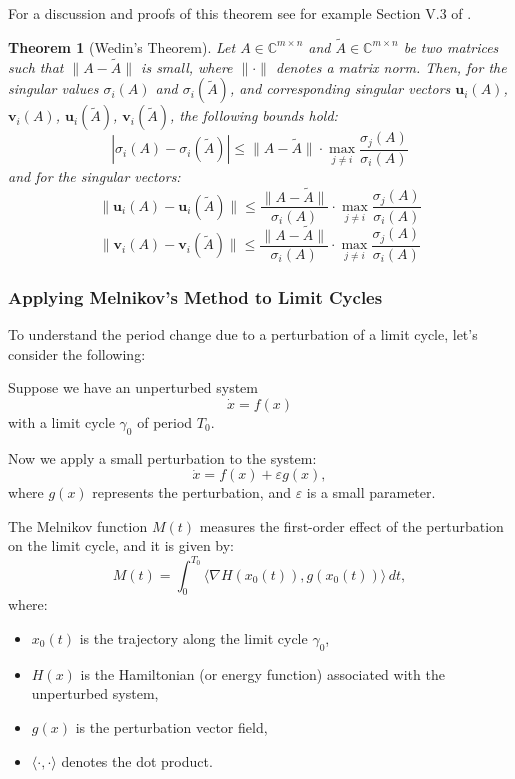 \documentclass{article}
\newtheorem{theorem}{Theorem}
\theoremstyle{definition} \newtheorem{definition}{Definition}
\theoremstyle{remark} \newtheorem{remark}{Remark}
\newcounter{ct}
\begin{document}
For a discussion and proofs of this theorem see for example Section V.3 of \citet{stewart1990matrix}.


\begin{theorem}[Wedin's Theorem]
Let \( A \in \mathbb{C}^{m \times n} \) and \( \tilde{A} \in \mathbb{C}^{m \times n} \) be two matrices such that \( \| A - \tilde{A} \| \) is small, where \( \| \cdot \| \) denotes a matrix norm. Then, for the singular values \( \sigma_i(A) \) and \( \sigma_i(\tilde{A}) \), and corresponding singular vectors \( \mathbf{u}_i(A) \), \( \mathbf{v}_i(A) \), \( \mathbf{u}_i(\tilde{A}) \), \( \mathbf{v}_i(\tilde{A}) \), the following bounds hold:
\[
\left| \sigma_i(A) - \sigma_i(\tilde{A}) \right| \leq \| A - \tilde{A} \| \cdot \max_{j \neq i} \frac{\sigma_j(A)}{\sigma_i(A)}
\]
and for the singular vectors:
\[
\| \mathbf{u}_i(A) - \mathbf{u}_i(\tilde{A}) \| \leq \frac{\| A - \tilde{A} \|}{\sigma_i(A)} \cdot \max_{j \neq i} \frac{\sigma_j(A)}{\sigma_i(A)}
\]
\[
\| \mathbf{v}_i(A) - \mathbf{v}_i(\tilde{A}) \| \leq \frac{\| A - \tilde{A} \|}{\sigma_i(A)} \cdot \max_{j \neq i} \frac{\sigma_j(A)}{\sigma_i(A)}
\]
\end{theorem}




\subsubsection{Applying Melnikov’s Method to Limit Cycles}

To understand the period change due to a perturbation of a limit cycle, let’s consider the following:

Suppose we have an unperturbed system
\[
\dot{x} = f(x)
\]
with a limit cycle \(\gamma_0\) of period \(T_0\).

Now we apply a small perturbation to the system:
\[
\dot{x} = f(x) + \varepsilon g(x),
\]
where \(g(x)\) represents the perturbation, and \(\varepsilon\) is a small parameter.

The Melnikov function \(M(t)\) measures the first-order effect of the perturbation on the limit cycle, and it is given by:
\[
M(t) = \int_0^{T_0} \langle \nabla H(x_0(t)), g(x_0(t)) \rangle \, dt,
\]
where:
\begin{itemize}
    \item \(x_0(t)\) is the trajectory along the limit cycle \(\gamma_0\),
    \item \(H(x)\) is the Hamiltonian (or energy function) associated with the unperturbed system,
    \item \(g(x)\) is the perturbation vector field,
    \item \(\langle \cdot, \cdot \rangle\) denotes the dot product.
\end{itemize}
\end{document}
